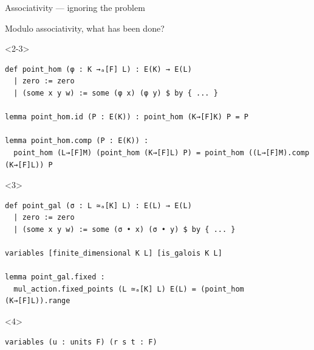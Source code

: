 \documentclass[10pt]{beamer}
\begin{document}
\begin{frame}[fragile, t]{Associativity --- ignoring the problem}

Modulo associativity, what has been done?


\begin{onlyenv}<2-3>
\begin{lstlisting}[basicstyle=\scriptsize, frame=single]
def point_hom (φ : K →ₐ[F] L) : E(K) → E(L)
  | zero := zero
  | (some x y w) := some (φ x) (φ y) $ by { ... }

lemma point_hom.id (P : E(K)) : point_hom (K→[F]K) P = P

lemma point_hom.comp (P : E(K)) :
  point_hom (L→[F]M) (point_hom (K→[F]L) P) = point_hom ((L→[F]M).comp (K→[F]L)) P
\end{lstlisting}
\end{onlyenv}


\begin{onlyenv}<3>
\begin{lstlisting}[basicstyle=\scriptsize, frame=single]
def point_gal (σ : L ≃ₐ[K] L) : E(L) → E(L)
  | zero := zero
  | (some x y w) := some (σ • x) (σ • y) $ by { ... }

variables [finite_dimensional K L] [is_galois K L]

lemma point_gal.fixed :
  mul_action.fixed_points (L ≃ₐ[K] L) E(L) = (point_hom (K→[F]L)).range
\end{lstlisting}
\end{onlyenv}


\begin{onlyenv}<4>
\begin{lstlisting}[basicstyle=\scriptsize, frame=single]
variables (u : units F) (r s t : F)


\end{lstlisting}
\end{onlyenv}
\end{frame}
\end{document}
